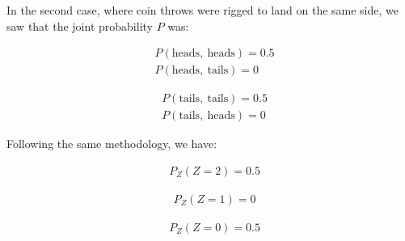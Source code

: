 \begin{example}
    In the second case, where coin throws were rigged to land on the same side, we saw that the joint probability $P$ was:\\
    \noindent
    \begin{minipage}[b]{0.5\linewidth}
    \begin{align*}
        & P(\text{heads}, ~\text{heads}) = 0.5\\
        & P(\text{heads}, ~\text{tails}) = 0
    \end{align*}
    \end{minipage}
    \begin{minipage}[b]{0.5\linewidth}
    \begin{align*}
        & P(\text{tails}, ~\text{tails}) = 0.5\\
        & P(\text{tails}, ~\text{heads}) = 0 
    \end{align*}
    \end{minipage}
    Following the same methodology, we have:\\
    \noindent\begin{minipage}[b]{0.33\linewidth}
    \begin{align*}
        & P_Z(Z=2) = 0.5
    \end{align*}
    \end{minipage}
    \begin{minipage}[b]{0.33\linewidth}
    \begin{align*}
        & P_Z(Z=1) = 0
    \end{align*}
    \end{minipage}
    \begin{minipage}[b]{0.33\linewidth}
    \begin{align*}
        & P_Z(Z=0) = 0.5
    \end{align*}
    \end{minipage}
    

\end{example}
